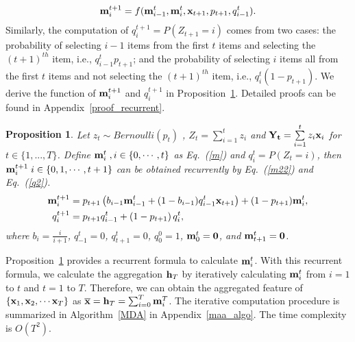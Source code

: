 \documentclass{article} \usepackage{iclr2019_conference,times}
\newtheorem{proposition}{Proposition}
\begin{document}
\begin{equation}
{\bf{m}}_i^{t+1} = f({\bf{m}}_{i-1}^t, {\bf{m}}_i^t, {\bf{x}}_{t+1}, p_{t+1}, q_{i-1}^t).
\end{equation}
Similarly, the computation of $q_i^{t+1} = P\left({Z_{t+1}}  = i \right)$ comes from two cases: the probability of selecting $ i-1 $ items from the first $ t $ items and selecting the ${(t+1)} ^{ th}$ item, i.e., $q_{i - 1}^t p_{t+1}$; and the probability of selecting $ i $ items all from the first $ t $ items and not selecting the ${(t+1)} ^{ th}$ item, i.e., $q_i^t \left( {1 - {p_{t + 1}}} \right)$. 
We derive the function of ${\bf{m}}_i^{t+1} $ and $  q_i^{t + 1}$ in Proposition~\ref{recurrent}. Detailed proofs can be found in Appendix~\ref{proof_recurrent}.
\begin{proposition}
\label{recurrent}
Let  $ z_{t} \sim Bernoulli(p_{t}) $ , ${Z_t} = \sum\limits_{i = 1}^t {{z_i}} $ and ${\bf{Y}_t} = \sum\limits_{i = 1}^t {{z_i}{{\bf{x}}_i}} $ for $t \in \{1,...,T\}$. Define ${\bf{m}}^t_i\;,i \in \{0,\cdots, t\} $ as Eq.~(\ref{m}) and $q_i^t = P\left({Z_t}  = i \right)$, then ${\bf{m}}_i^{t+1}\; i \in \{0,1,\cdots, t+1\}$ can be obtained recurrently by Eq.~(\ref{m22}) and Eq.~(\ref{q2}).  
\begin{align}
{\bf{m}}_i^{t + 1} & = {p_{t + 1}}\left( {{b_{i - 1}}{\bf{m}}_{i - 1}^t + (1 - {b_{i - 1}})q_{i - 1}^t{{\bf{x}}_{t + 1}}} \right) + (1 - {p_{t + 1}}){\bf{m}}_i^t, \label{m22} \\
q_i^{t + 1} & = {p_{t + 1}}q_{i - 1}^t + \left( {1 - {p_{t + 1}}} \right)q_i^t,\label{q2}
\end{align}
where $b_i = \frac{i}{i+1}$, $q_{-1}^t=0$, $q_{t+1}^t=0$, $ q_{0}^0=1$, ${\bf{m}}_0^t = {\bf{0}}$, and ${\bf{m}}_{t+1}^t = {\bf{0}}$.

\end{proposition}
Proposition~\ref{recurrent} provides a recurrent formula to calculate ${\bf{m}}^t_i $. With this recurrent formula, we calculate the aggregation ${\bf{h}}_T$ by iteratively calculating ${\bf{m}}^t_i$ from $i=1$ to $t$ and $t=1$ to $T$. Therefore, we can obtain the aggregated feature of $ \{{\bf{x}}_1,{\bf x}_2,\cdots {\bf{x}}_T\}$ as $ \overline{\bf{x}} =  {\bf{h}}_T = \sum\nolimits_{i = 0}^T {{\bf m}_i^T } $. The iterative computation procedure is summarized in Algorithm~\ref{MDA} in Appendix~\ref{maa_algo}. The time complexity is $ O(T^2) $.
\end{document}
